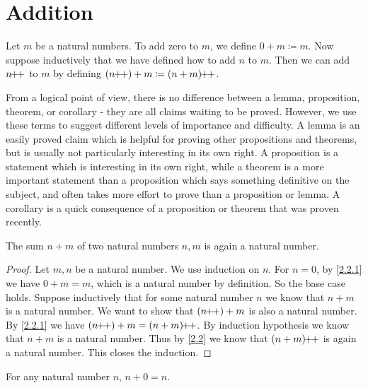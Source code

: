 \section{Addition}\label{sec:2.2}

\begin{defn}\label{2.2.1}
  Let \(m\) be a natural numbers.
  To add zero to \(m\), we define \(0 + m \coloneqq m\).
  Now suppose inductively that we have defined how to add \(n\) to \(m\).
  Then we can add \(n\!\!+\!\!+\) to \(m\) by defining \((n\pp) + m \coloneqq (n + m)\pp\).
\end{defn}

\begin{note}
  From a logical point of view, there is no difference between a lemma, proposition, theorem, or corollary
  - they are all claims waiting to be proved.
  However, we use these terms to suggest different levels of importance and difficulty.
  A lemma is an easily proved claim which is helpful for proving other propositions and theorems, but is usually not particularly interesting in its own right.
  A proposition is a statement which is interesting in its own right, while a theorem is a more important statement than a proposition which says something definitive on the subject, and often takes more effort to prove than a proposition or lemma.
  A corollary is a quick consequence of a proposition or theorem that was proven recently.
\end{note}

\begin{ac}\label{ac:2.2.1}
  The sum \(n + m\) of two natural numbers \(n, m\) is again a natural number.
\end{ac}

\begin{proof}
  Let \(m, n\) be a natural number.
  We use induction on \(n\).
  For \(n = 0\), by \cref{2.2.1} we have \(0 + m = m\), which is a natural number by definition.
  So the base case holds.
  Suppose inductively that for some natural number \(n\) we know that \(n + m\) is a natural number.
  We want to show that \((n\!\!+\!\!+) + m\) is also a natural number.
  By \cref{2.2.1} we have \((n\pp) + m = (n + m)\pp\).
  By induction hypothesis we know that \(n + m\) is a natural number.
  Thus by \cref{2.2} we know that \((n + m)\!\!+\!\!+\) is again a natural number.
  This closes the induction.
\end{proof}

\begin{lem}\label{2.2.2}
  For any natural number \(n\), \(n + 0 = n\).
\end{lem}

